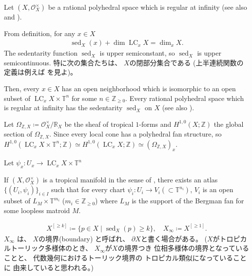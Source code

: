 \documentclass[a4paper,dvipdfmx,reqno,12pt]{amsart}
\theoremstyle{definition}
\newcommand{\deq}{\coloneqq}
\newcommand{\opn}[1]{\operatorname{#1}}
\numberwithin{equation}{section}
\begin{document}
Let $(X,\mathcal{O}_X^{\times})$ be
a rational polyhedral space which is regular at
infinity \cite[]{MR4637248}
(see also \cite[Definition 1.2]{MR3330789}
and \cite[Definition 7.2.4]{mikhalkin2018tropical}).

From definition, for any $x\in X$
\begin{align}
\opn{sed}_X(x)+\dim \opn{LC}_x X=\dim_x X.
\end{align}
The sedentarity function
$\opn{sed}_X$ is upper semiconstant, so 
$\opn{sed}_X$ is upper semicontinuous.
特に次の集合たちは、
$X$の閉部分集合である
(上半連続関数の定義は例えば\cite[p.287]{MR463157}
を見よ)。

Then, every $x\in X$ has an open neighborhood
which is isomorphic to an open subset of 
$\opn{LC}_x X\times \mathbb{T}^n$ for some
$n\in \mathbb{Z}_{\geq 0}$.
Every rational polyhedral space which is regular
at infinity has the sedentarity
$\opn{sed}_X$ on $X$
\cite[Definition 7.2.6]{mikhalkin2018tropical}
(see also \cite[Definition 2.4]{demedrano2023chern}).

Let $\Omega_{\mathbb{Z},X}\deq
\mathcal{O}_X^{\times}/\mathbb{R}_X$ be
the sheaf of tropical $1$-forms and
$H^{1,0}(X;\mathbb{Z})$ the global section of 
$\Omega_{\mathbb{Z},X}$.
Since every local cone has a polyhedral fan structure,
so $H^{1,0}(\opn{LC}_x X\times \mathbb{T}^n;\mathbb{Z})
\simeq H^{1,0}(\opn{LC}_x X;\mathbb{Z})\simeq 
(\Omega_{\mathbb{Z},X})_x$.

Let $\psi_x\colon U_x \to \opn{LC}_x X\times \mathbb{T}^n$

If $(X,\mathcal{O}_X^{\times})$ is a tropical manifold
in the sense of \cite[Definition 6.1]{gross2019sheaftheoretic},
there exists an atlas $\{(U_i,\psi_i)\}_{i\in I}$
such that for every chart $\psi_i \colon U_i \to V_i 
(\subset \mathbb{T}^{n_i})$,
$V_i$ is an open subset of $L_M\times \mathbb{T}^{m_i}$
($m_i\in \mathbb{Z}_{\geq 0}$) where 
$L_M$ is the support of
the Bergman fan for some loopless matroid $M$.


\begin{align}
X^{[\geq k]}\deq \{p\in X\mid \opn{sed}_X(p)\geq k\},
\quad 
X_{\infty}\deq X^{[\geq 1]}.
\end{align}
$X_{\infty}$ は、
$X$の境界(boundary)
と呼ばれ、
$\partial X$と書く場合がある。
($X$がトロピカルトーリック多様体のとき、
$X_{\infty}$が$X$の境界つき
位相多様体の境界となっていることと、
代数幾何におけるトーリック境界の
トロピカル類似になっていることに
由来していると思われる。)
\end{document}
